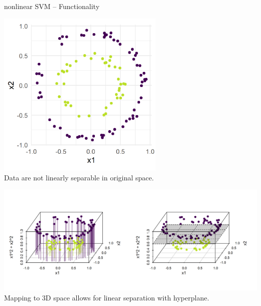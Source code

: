 \begin{frame}{nonlinear SVM -- Functionality}
\begin{minipage}[b]{0.33\textwidth}
  \centering
  \includegraphics[width=0.6\textwidth]{
  ../slides/nonlinear-svm/figure/circles_ds.png} \\
  \tiny{Data are not linearly separable in original space.} 
\end{minipage}
\begin{minipage}[b]{0.66\textwidth}
  \centering
  \includegraphics[width=\textwidth, trim=0 30 0 0, clip]{
  ../slides/nonlinear-svm/figure/circles_feature_map.png} \\
  \tiny{Mapping to 3D space allows for linear separation with hyperplane.}
\end{minipage}

\end{frame}


